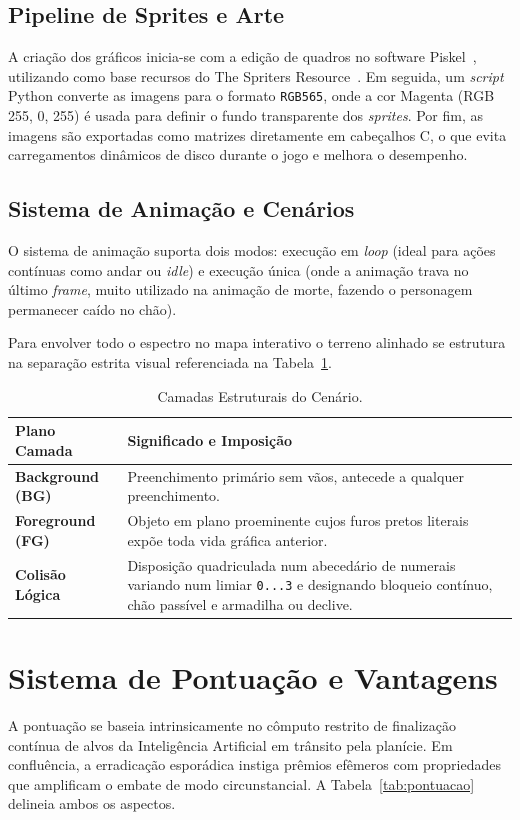\documentclass[10pt,twocolumn,letterpaper]{article}
\begin{document}
\subsection{Pipeline de Sprites e Arte}
A criação dos gráficos inicia-se com a edição de quadros no software Piskel~\cite{piskel}, utilizando como base recursos do The Spriters Resource~\cite{spriters}. Em seguida, um \textit{script} Python converte as imagens para o formato \texttt{RGB565}, onde a cor Magenta (RGB 255, 0, 255) é usada para definir o fundo transparente dos \textit{sprites}. Por fim, as imagens são exportadas como matrizes diretamente em cabeçalhos C, o que evita carregamentos dinâmicos de disco durante o jogo e melhora o desempenho.

\subsection{Sistema de Animação e Cenários}
O sistema de animação suporta dois modos: execução em \textit{loop} (ideal para ações contínuas como andar ou \textit{idle}) e execução única (onde a animação trava no último \textit{frame}, muito utilizado na animação de morte, fazendo o personagem permanecer caído no chão).

Para envolver todo o espectro no mapa interativo o terreno alinhado se estrutura na separação estrita visual referenciada na Tabela~\ref{tab:cenarios}.

\begin{table}[H]
\centering
\caption{Camadas Estruturais do Cenário.}
\label{tab:cenarios}
\scriptsize
\begin{tabularx}{\columnwidth}{@{}lX@{}}
\toprule
\textbf{Plano Camada} & \textbf{Significado e Imposição} \\ \midrule
\textbf{Background (BG)} & Preenchimento primário sem vãos, antecede a qualquer preenchimento. \\
\textbf{Foreground (FG)} & Objeto em plano proeminente cujos furos pretos literais expõe toda vida gráfica anterior. \\
\textbf{Colisão Lógica} & Disposição quadriculada num abecedário de numerais variando num limiar \texttt{0...3} e designando bloqueio contínuo, chão passível e armadilha ou declive. \\ \bottomrule
\end{tabularx}
\end{table}

\section{Sistema de Pontuação e Vantagens}
A pontuação se baseia intrinsicamente no cômputo restrito de finalização contínua de alvos da Inteligência Artificial em trânsito pela planície. Em confluência, a erradicação esporádica instiga prêmios efêmeros com propriedades que amplificam o embate de modo circunstancial. A Tabela~\ref{tab:pontuacao} delineia ambos os aspectos.
\end{document}
